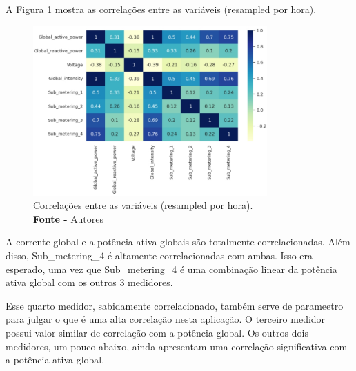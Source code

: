 A Figura \ref{fig: Correlação entre as variáveis (resampled por hora)} mostra as correlações entre as variáveis (resampled por hora).
\begin{figure}[H]
    \centering
    \includegraphics[width=0.80\textwidth]{Figuras/4. Resultados e Discussões/Exer4/Correlação entre as variáveis (resampled por hora).jpg}
    \caption{Correlações entre as variáveis (resampled por hora).\\ \textbf{Fonte -} Autores}
    \label{fig: Correlação entre as variáveis (resampled por hora)}
\end{figure}

A corrente global e a potência ativa globais são totalmente  correlacionadas. Além disso, Sub\_metering\_4 é altamente correlacionadas com ambas. Isso era esperado, uma vez que Sub\_metering\_4 é uma combinação linear da potência ativa global com os outros $3$ medidores.

Esse quarto medidor, sabidamente correlacionado, também serve de parameetro para julgar o que é uma alta correlação nesta aplicação. O terceiro medidor possui valor similar de correlação com a potência global. Os outros dois medidores, um pouco abaixo, ainda apresentam uma correlação significativa com a potência ativa global.

